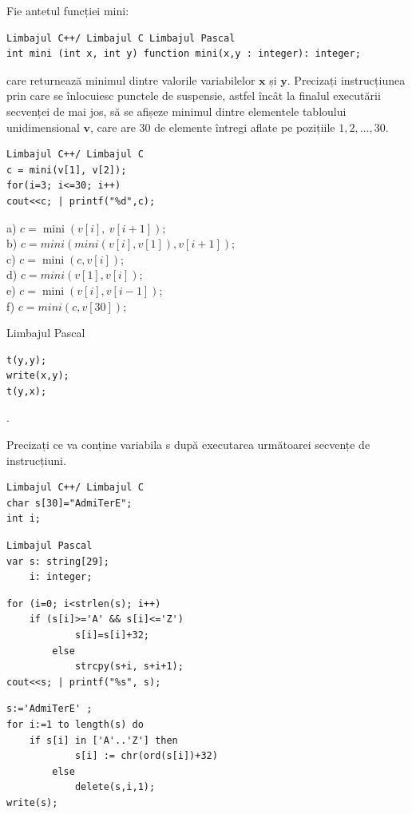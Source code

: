 \documentclass[10pt]{article}
\begin{document}
Fie antetul funcției mini:

\begin{verbatim}
Limbajul C++/ Limbajul C Limbajul Pascal
int mini (int x, int y) function mini(x,y : integer): integer;
\end{verbatim}

care returnează minimul dintre valorile variabilelor $\mathbf{x}$ și $\mathbf{y}$. Precizați instrucțiunea prin care se înlocuiesc punctele de suspensie, astfel încât la finalul executării secvenței de mai jos, să se afișeze minimul dintre elementele tabloului unidimensional $\mathbf{v}$, care are 30 de elemente întregi aflate pe pozițiile $1,2, \ldots, 30$.

\begin{verbatim}
Limbajul C++/ Limbajul C
c = mini(v[1], v[2]);
for(i=3; i<=30; i++)
cout<<c; | printf("%d",c);
\end{verbatim}

a) $c=\operatorname{mini}(v[i], ~ v[i+1]) ;$\\
b) $c=m i n i(m i n i(v[i], v[1]), v[i+1]) ;$\\
c) $c=\operatorname{mini}(c, v[i])$;\\
d) $c=m i n i(v[1], v[i]) ;$\\
e) $c=\operatorname{mini}(v[i], v[i-1])$;\\
f) $c=m i n i(c, v[30]) ;$

Limbajul Pascal

\begin{verbatim}
t(y,y);
write(x,y);
t(y,x);
\end{verbatim}

.

Precizați ce va conține variabila s după executarea următoarei secvențe de instrucțiuni.

\begin{verbatim}
Limbajul C++/ Limbajul C
char s[30]="AdmiTerE";
int i;
\end{verbatim}

\begin{verbatim}
Limbajul Pascal
var s: string[29];
    i: integer;
\end{verbatim}

\begin{verbatim}
for (i=0; i<strlen(s); i++)
    if (s[i]>='A' && s[i]<='Z')
            s[i]=s[i]+32;
        else
            strcpy(s+i, s+i+1);
cout<<s; | printf("%s", s);
\end{verbatim}

\begin{verbatim}
s:='AdmiTerE' ;
for i:=1 to length(s) do
    if s[i] in ['A'..'Z'] then
            s[i] := chr(ord(s[i])+32)
        else
            delete(s,i,1);
write(s);
\end{verbatim}
\end{document}
